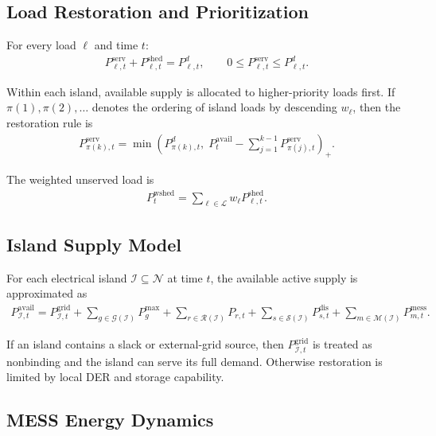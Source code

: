 \subsection{Load Restoration and Prioritization}

For every load $\ell$ and time $t$:
\begin{align}
P^{\mathrm{serv}}_{\ell,t} + P^{\mathrm{shed}}_{\ell,t} = P^{d}_{\ell,t},
\qquad
0 \le P^{\mathrm{serv}}_{\ell,t} \le P^{d}_{\ell,t}.
\end{align}

Within each island, available supply is allocated to higher-priority loads
first. If $\pi(1),\pi(2),\dots$ denotes the ordering of island loads by
descending $w_{\ell}$, then the restoration rule is
\begin{align}
P^{\mathrm{serv}}_{\pi(k),t}
= \min\left(P^{d}_{\pi(k),t},
\; P^{\mathrm{avail}}_{t} - \sum_{j=1}^{k-1} P^{\mathrm{serv}}_{\pi(j),t}\right)_{+}.
\end{align}

The weighted unserved load is
\begin{align}
P^{\mathrm{wshed}}_t = \sum_{\ell\in\mathcal{L}} w_{\ell} P^{\mathrm{shed}}_{\ell,t}.
\end{align}

\subsection{Island Supply Model}

For each electrical island $\mathcal{I}\subseteq\mathcal{N}$ at time $t$, the
available active supply is approximated as
\begin{align}
P^{\mathrm{avail}}_{\mathcal{I},t} =
P^{\mathrm{grid}}_{\mathcal{I},t}
+ \sum_{g\in\mathcal{G}(\mathcal{I})} P^{\max}_{g}
+ \sum_{r\in\mathcal{R}(\mathcal{I})} P_{r,t}
+ \sum_{s\in\mathcal{S}(\mathcal{I})} P^{\mathrm{dis}}_{s,t}
+ \sum_{m\in\mathcal{M}(\mathcal{I})} P^{\mathrm{mess}}_{m,t}.
\end{align}

If an island contains a slack or external-grid source, then
$P^{\mathrm{grid}}_{\mathcal{I},t}$ is treated as nonbinding and the island can
serve its full demand. Otherwise restoration is limited by local DER and
storage capability.

\subsection{MESS Energy Dynamics}

